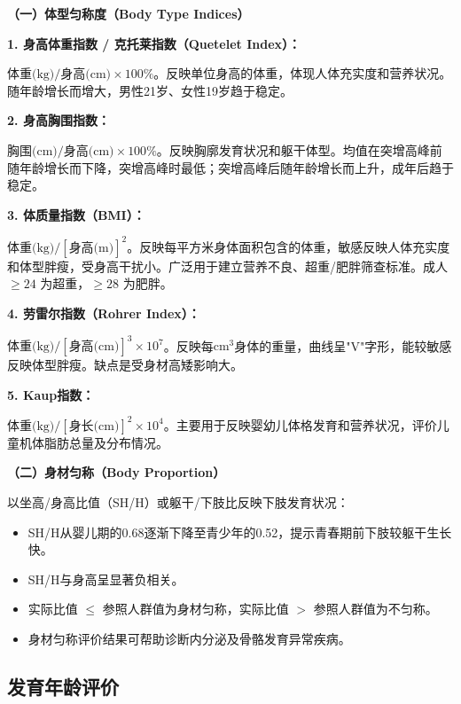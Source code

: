 \begin{keybox}
\textbf{（一）体型匀称度（Body Type Indices）}

\textbf{1. 身高体重指数 / 克托莱指数（Quetelet Index）：}

$\text{体重(kg)} / \text{身高(cm)} \times 100\%$。反映单位身高的体重，体现人体充实度和营养状况。随年龄增长而增大，男性21岁、女性19岁趋于稳定。

\textbf{2. 身高胸围指数：}

$\text{胸围(cm)} / \text{身高(cm)} \times 100\%$。反映胸廓发育状况和躯干体型。均值在突增高峰前随年龄增长而下降，突增高峰时最低；突增高峰后随年龄增长而上升，成年后趋于稳定。

\textbf{3. 体质量指数（BMI）：}

$\text{体重(kg)} / [\text{身高(m)}]^2$。反映每平方米身体面积包含的体重，敏感反映人体充实度和体型胖瘦，受身高干扰小。广泛用于建立营养不良、超重/肥胖筛查标准。成人 $\geq 24$ 为超重，$\geq 28$ 为肥胖。

\textbf{4. 劳雷尔指数（Rohrer Index）：}

$\text{体重(kg)} / [\text{身高(cm)}]^3 \times 10^7$。反映每$\mathrm{cm}^3$身体的重量，曲线呈"V"字形，能较敏感反映体型胖瘦。缺点是受身材高矮影响大。

\textbf{5. Kaup指数：}

$\text{体重(kg)} / [\text{身长(cm)}]^2 \times 10^4$。主要用于反映婴幼儿体格发育和营养状况，评价儿童机体脂肪总量及分布情况。

\textbf{（二）身材匀称（Body Proportion）}

以坐高/身高比值（SH/H）或躯干/下肢比反映下肢发育状况：

\begin{itemize}[leftmargin=*]
    \item SH/H从婴儿期的0.68逐渐下降至青少年的0.52，提示青春期前下肢较躯干生长快。
    \item SH/H与身高呈显著负相关。
    \item 实际比值 $\leq$ 参照人群值为身材匀称，实际比值 $>$ 参照人群值为不匀称。
    \item 身材匀称评价结果可帮助诊断内分泌及骨骼发育异常疾病。
\end{itemize}
\end{keybox}

\subsection{发育年龄评价}

